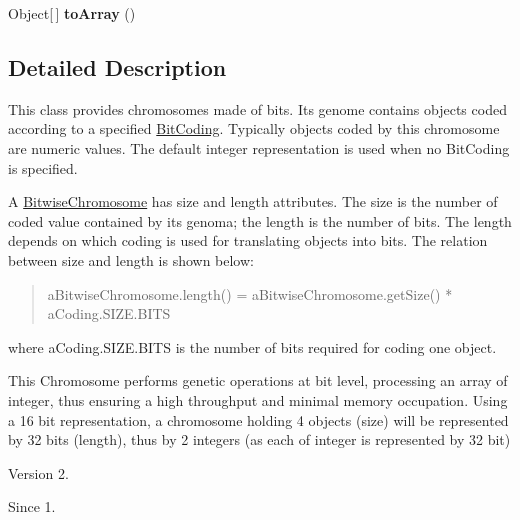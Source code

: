 \begin{DoxyCompactItemize}
\item 
\hypertarget{classjenes_1_1chromosome_1_1_bitwise_chromosome_aa191192f94ce72a631237674d81ae393}{Object\mbox{[}$\,$\mbox{]} {\bfseries to\-Array} ()}\label{classjenes_1_1chromosome_1_1_bitwise_chromosome_aa191192f94ce72a631237674d81ae393}

\end{DoxyCompactItemize}


\subsection{Detailed Description}
This class provides chromosomes made of bits. Its genome contains objects coded according to a specified \hyperlink{}{Bit\-Coding}. Typically objects coded by this chromosome are numeric values. The default integer representation is used when no Bit\-Coding is specified. 

A \hyperlink{classjenes_1_1chromosome_1_1_bitwise_chromosome}{Bitwise\-Chromosome} has size and length attributes. The size is the number of coded value contained by its genoma; the length is the number of bits. The length depends on which coding is used for translating objects into bits. The relation between size and length is shown below\-: 

\begin{quotation}

\begin{DoxyPre}
 aBitwiseChromosome.length() = aBitwiseChromosome.getSize() *  aCoding.SIZE.BITS
\end{DoxyPre}
\end{quotation}
where a\-Coding.\-S\-I\-Z\-E.\-B\-I\-T\-S is the number of bits required for coding one object. 

This Chromosome performs genetic operations at bit level, processing an array of integer, thus ensuring a high throughput and minimal memory occupation. Using a 16 bit representation, a chromosome holding 4 objects (size) will be represented by 32 bits (length), thus by 2 integers (as each of integer is represented by 32 bit)

\begin{DoxyVersion}{Version}
2. 
\end{DoxyVersion}
\begin{DoxySince}{Since}
1. 
\end{DoxySince}


